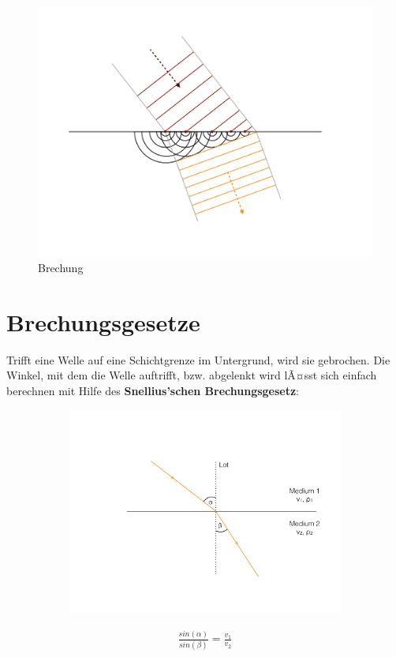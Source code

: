 \begin{figure}[H]
	\centering
	\includegraphics[width = \textwidth]{SeismikBilder/HuygensBrechung}
	\caption*{Brechung}
\end{figure}


\section{Brechungsgesetze}
Trifft eine Welle auf eine Schichtgrenze im Untergrund, wird sie gebrochen. Die Winkel, mit dem die Welle auftrifft, bzw. abgelenkt wird lÃ¤sst sich einfach berechnen mit Hilfe des \textbf{Snellius'schen Brechungsgesetz}:

\begin{figure}[H]
	\begin{subfigure}[m]{0.5\textwidth}
	\centering
		\includegraphics[scale=0.3]{SeismikBilder/Brechungsgesetz}
	\end{subfigure}
	\begin{subfigure}[m]{0.75\textwidth}
	\centering
		\[\begin{aligned}
			\frac{sin(\alpha)}{sin(\beta)} = \frac{v_1}{v_2}
		\end{aligned}\]
	\end{subfigure}
\end{figure}


